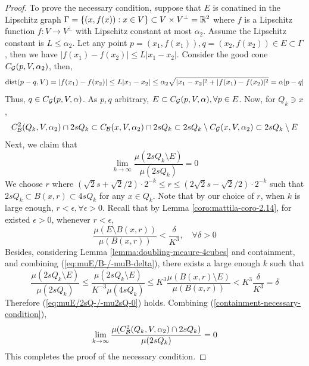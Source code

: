 \begin{proof}
    To prove the necessary condition, suppose that $E$ is conatined in the Lipschitz graph $\Gamma = \{(x, f(x)) : x\in V\}\subset V\times V^\perp = \mathbb{R}^2$ where $f$ is a Lipschitz function $f: V\rightarrow V^\perp$ with Lipschitz constant at most $\alpha_2$. Assume the Lipschitz constant is $L\leq \alpha_2$. Let any point $p = (x_1, f(x_1)), q = (x_2, f(x_2))\in E\subset \Gamma$, then we have $|f(x_1)-f(x_2)| \leq L |x_1- x_2|$. Consider the good cone $C_\mathcal G(p, V, \alpha_2)$, then, 
    \begin{equation*}
            \operatorname{dist}(p-q, V) = |f(x_1)- f(x_2)| 
            \leq L|x_1-x_2| 
            \leq \alpha_2 \sqrt{|x_1-x_2|^2 + |f(x_1)-f(x_2)|^2}
            = \alpha |p-q|
    \end{equation*}
    Thus, $q\in C_\mathcal G(p, V, \alpha)$. As $p,q$ arbitrary, $E\subset C_\mathcal G(p, V, \alpha), \forall p\in E$. Now, for $Q_k\ni x$,
    \begin{equation}
        C_\mathcal B^{2}(Q_k, V, \alpha_2)\cap 2sQ_k \subset C_\mathcal B(x,V, \alpha_2) \cap 2sQ_k \subset 2sQ_k \setminus C_\mathcal G(x, V, \alpha_2) \subset 2sQ_k \setminus E   
    \end{equation}
    Next, we claim that
    \begin{equation}
        \lim_{k\rightarrow \infty}\frac{\mu(2sQ_k \setminus E)}{\mu(2sQ_k)} =0
    \end{equation}
    We choose $r$ where $(\sqrt{2}s + \sqrt{2}/2) \cdot 2^{-k} \leq r \leq (2\sqrt{2}s - \sqrt{2}/2)\cdot 2^{-k} $ such that $2sQ_k\subset B(x,r)\subset 4sQ_k$ for any $x\in Q_k$. Note that by our choice of $r$, when $k$ is large enough, $r < \epsilon, \forall \epsilon > 0$. Recall that by Lemma \ref{coro:mattila-coro-2.14}, for existed $\epsilon > 0$, whenever $r<\epsilon$, 
    \begin{equation}
        \frac{\mu(E \setminus B(x, r))}{\mu(B(x, r))} < \frac{\delta}{K^3}, \quad \forall\delta > 0
    \end{equation}
    Besides, considering Lemma \ref{lemma:doubling-meaure-4cubes} and containment, and combining (\ref{eq:muE/B-/-muB-delta}), there exists a large enough $k$ such that 
    \begin{equation*}
        \frac{\mu(2sQ_k \setminus E)}{\mu(2sQ_k)}\leq \frac{\mu(2sQ_k \setminus E)}{K^{-3}\mu(4sQ_k)} \leq K^3 \frac{\mu(B(x, r) \setminus E)}{\mu(B(x, r))} < K^3\frac{\delta}{K^3} = \delta
    \end{equation*}
    Therefore (\ref{eq:muE/2sQ-/-mu2sQ-0}) holds. Combining (\ref{containment-necessary-condition}),
    \begin{equation*}
        \lim_{k\rightarrow \infty}\frac{\mu(C_\mathcal B^{2}(Q_k, V, \alpha_2)\cap 2sQ_k)}{\mu(2sQ_k)} =0
    \end{equation*}
    This completes the proof of the necessary condition. 
\end{proof}


